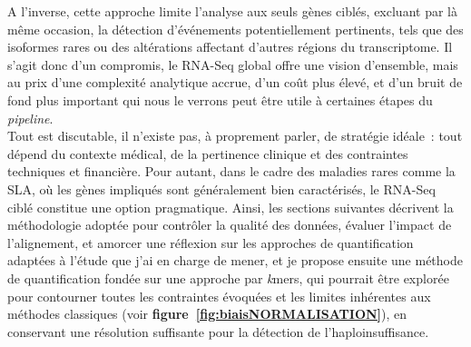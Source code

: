 A l'inverse, cette approche limite l’analyse aux seuls gènes ciblés, excluant par là même occasion, la détection d’événements potentiellement pertinents, tels que des isoformes rares ou des altérations affectant d’autres régions du transcriptome. Il s’agit donc d’un compromis, le RNA-Seq global offre une vision d’ensemble, mais au prix d’une complexité analytique accrue, d’un coût plus élevé, et d’un bruit de fond plus important qui nous le verrons peut être utile à certaines étapes du \textit{pipeline}.  \\

Tout est discutable, il n’existe pas, à proprement parler, de stratégie idéale~: tout dépend du contexte médical, de la pertinence clinique et des contraintes techniques et financière. Pour autant, dans le cadre des maladies rares comme la SLA, où les gènes impliqués sont généralement bien caractérisés, le RNA-Seq ciblé constitue une option pragmatique. Ainsi, les sections suivantes décrivent la méthodologie adoptée pour contrôler la qualité des données, évaluer l'impact de l'alignement, et amorcer une réflexion sur les approches de quantification adaptées à l’étude que j’ai en charge de mener, et je propose ensuite une méthode de quantification fondée sur une approche par \textit{k}mers, qui pourrait être explorée pour contourner toutes les contraintes évoquées et les limites inhérentes aux méthodes classiques (voir \textbf{figure~\ref{fig:biaisNORMALISATION}}), en conservant une résolution suffisante pour la détection de l’haploinsuffisance.
